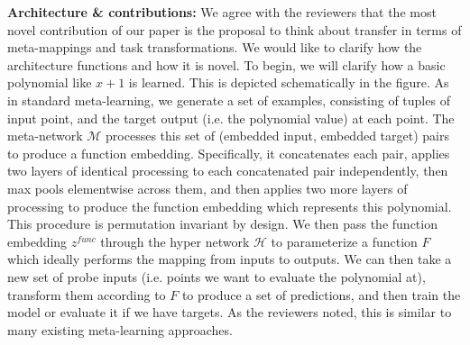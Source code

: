 \documentclass{article}
\begin{document}
\textbf{Architecture \& contributions:} We agree with the reviewers that the most novel contribution of our paper is the proposal to think about transfer in terms of meta-mappings and task transformations. We would like to clarify how the architecture functions and how it is novel. To begin, we will clarify how a basic polynomial like $x + 1$ is learned. This is depicted schematically in the figure. As in standard meta-learning, we generate a set of examples, consisting of tuples of input point, and the target output (i.e. the polynomial value) at each point. The meta-network $\mathcal{M}$ processes this set of (embedded input, embedded target) pairs to produce a function embedding. Specifically, it concatenates each pair, applies two layers of identical processing to each concatenated pair independently, then max pools elementwise across them, and then applies two more layers of processing to produce the function embedding which represents this polynomial. This procedure is permutation invariant by design. We then pass the function embedding $z^{func}$ through the hyper network $\mathcal{H}$ to parameterize a function $F$ which ideally performs the mapping from inputs to outputs. We can then take a new set of probe inputs (i.e. points we want to evaluate the polynomial at), transform them according to $F$ to produce a set of predictions, and then train the model or evaluate it if we have targets. As the reviewers noted, this is similar to many existing meta-learning approaches. \par 
{}
\end{document}
